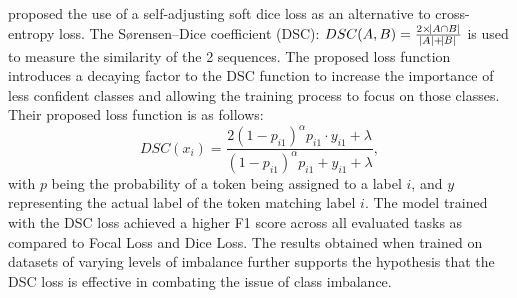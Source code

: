 \documentclass[a4paper]{article}
\begin{document}
\begin{multicols}{2}
\citet{li2020dice} proposed the use of a self-adjusting soft dice loss as an alternative to cross-entropy loss. The Sørensen–Dice coefficient (DSC): $DSC(A,B)=\frac{2 \times\abs{A \cap B}}{\abs{A} + \abs{B}}$ is used to measure the similarity of the 2 sequences. The proposed loss function introduces a decaying factor to the DSC function to increase the importance of less confident classes and allowing the training process to focus on those classes. Their proposed loss function is as follows: \[
DSC(x_i)=\frac{2{(1-p_{i1})}^{\alpha}p_{i1}\cdot y_{i1}+\lambda}{{(1-p_{i1})}^{\alpha}p_{i1}+ y_{i1}+\lambda} ,\] with $p$ being the probability of a token being assigned to a label $i$, and $y$ representing the actual label of the token matching label $i$.
The model trained with the DSC loss achieved a higher F1 score across all evaluated tasks as compared to Focal Loss and Dice Loss. The results obtained when trained on datasets of varying levels of imbalance further supports the hypothesis that the DSC loss is effective in combating the issue of class imbalance. 




\end{multicols}
\end{document}
